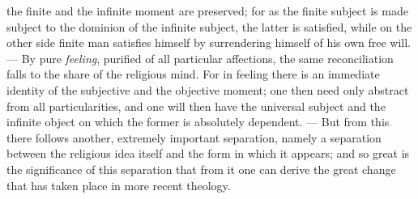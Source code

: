 \documentclass[12pt]{book}
\begin{document}
the finite and the infinite moment are preserved; for as the finite subject is
made subject to the dominion of the infinite subject, the latter is satisfied,
while on the other side finite man satisfies himself by surrendering himself of
his own free will. --- By pure \emph{feeling}, purified of all particular
affections, the same reconciliation falls to the share of the religious mind.
For in feeling there is an immediate identity of the subjective and the
objective moment; one then need only abstract from all particularities, and one
will then have the universal subject and the infinite object on which the
former is absolutely dependent. --- But from this there follows another,
extremely important separation, namely a separation between the religious idea
itself and the form in which it appears; and so great is the significance of
this separation that from it one can derive the great change that has taken
place in more recent theology.
\end{document}
